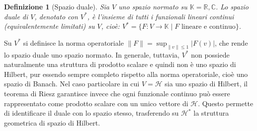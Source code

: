 \documentclass[a4paper,12pt]{report}
\newtheorem{definizione}{Definizione}[chapter]
\begin{document}
\begin{definizione}[Spazio duale]
Sia $V$ uno spazio normato su $\mathbb{K}=\mathbb{R},\mathbb{C}$. Lo spazio duale di $V$, denotato con $V^*$, è l’insieme di tutti i funzionali lineari continui (equivalentemente limitati) su $V$, cioè: $V^* = \{F: V \to \mathbb{K} \mid F \text{ lineare e continuo}\}$.

\end{definizione}

Su $V^*$ si definisce la norma operatoriale $\|F\|=\sup_{\|v\|\le 1}|F(v)|$, che rende lo spazio duale uno spazio normato. In generale, tuttavia, $V^*$ non possiede naturalmente una struttura di prodotto scalare e quindi non è uno spazio di Hilbert, pur essendo sempre completo rispetto alla norma operatoriale, cioè uno spazio di Banach. Nel caso particolare in cui $V=\mathscr{H}$ sia uno spazio di Hilbert, il teorema di Riesz garantisce invece che ogni funzionale continuo può essere rappresentato come prodotto scalare con un unico vettore di $\mathscr{H}$. Questo permette di identificare il duale con lo spazio stesso, trasferendo su $\mathscr{H}^*$ la struttura geometrica di spazio di Hilbert.
\end{document}
